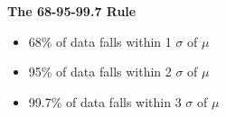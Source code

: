 \documentclass{article}
\begin{document}
\noindent
\textbf{The 68-95-99.7 Rule}
\begin{itemize}
    \item 68\% of data falls within 1 \begin{math}\sigma\end{math} of \begin{math}\mu\end{math} 
    \item 95\% of data falls within 2 \begin{math}\sigma\end{math} of \begin{math}\mu\end{math} 
    \item 99.7\% of data falls within 3 \begin{math}\sigma\end{math} of \begin{math}\mu\end{math} 
\end{itemize}
\end{document}
